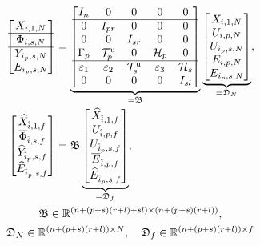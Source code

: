 \begin{alignat}{2}
    \begin{bmatrix}
        X_{i,1,N}\\
        \hline
        \Phi_{i,s,N}\\
        \hline
        Y_{i_p,s,N}\\
        E_{i_p,s,N}
    \end{bmatrix}&=
    \underbrace{\begin{bmatrix}
        I_n      & 0      & 0       & 0 & 0\\
        \hline
        0        & I_{pr} & 0       & 0 & 0\\
        0        & 0      & I_{sr}  & 0 & 0\\
        \Gamma_p & \mathcal{T}_p^\mathrm{u} & 0 & \mathcal{H}_p & 0\\
        \hline
        \varepsilon_1 & \varepsilon_2 & \mathcal{T}_s^\mathrm{u} & \varepsilon_3 & \mathcal{H}_s\\
        0 & 0 & 0 & 0 & I_{sl}
    \end{bmatrix}}_{=\mathfrak{B}}
    \underbrace{\begin{bmatrix}
        X_{i,1,N}\\
        U_{i,p,N}\\
        U_{i_p,s,N}\\
        E_{i,p,N}\\
        E_{i_p,s,N}
    \end{bmatrix}}_{=\mathfrak{D}_N},\notag\\%
    \begin{bmatrix}
        \widehat{X}_{\hat{i},1,f}\\
        \overline{\Phi}_{\hat{i},s,f}\\
        \widehat{Y}_{\hat{i}_p,s,f}\\
        \widehat{E}_{\hat{i}_p,s,f}
    \end{bmatrix}&=
    \mathfrak{B}
    \underbrace{\begin{bmatrix}
        \widehat{X}_{\hat{i},1,f}\\
        U_{\hat{i},p,f}\\
        U_{\hat{i}_p,s,f}\\
        \overline{E}_{\hat{i},p,f}\\
        \widehat{E}_{\hat{i}_p,s,f}
    \end{bmatrix}}_{=\mathfrak{D}_f},\label{eq:BD_f}\\%
    \span\mathfrak{B}\in\mathbb{R}^{(n+(p+s)(r+l)+sl)\times (n+(p+s)(r+l))},\notag\\
    \span\mathfrak{D}_N\in\mathbb{R}^{(n+(p+s)(r+l))\times N},\quad \mathfrak{D}_f\in\mathbb{R}^{(n+(p+s)(r+l))\times f}\notag
\end{alignat}
